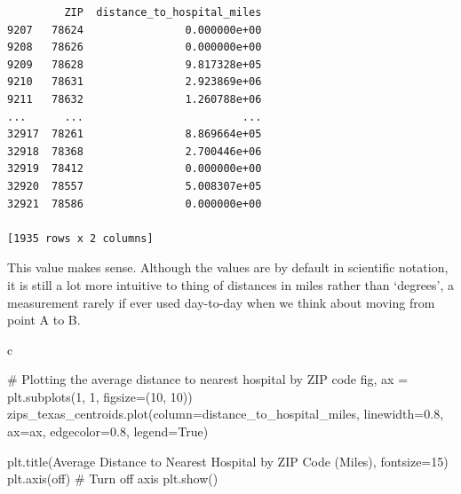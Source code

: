 \documentclass[
  letterpaper,
  DIV=11,
  numbers=noendperiod]{scrartcl}
\newenvironment{Shaded}{\begin{snugshade}}{\end{snugshade}}
\newcommand{\CommentTok}[1]{\textcolor[rgb]{0.37,0.37,0.37}{#1}}
\newcommand{\DecValTok}[1]{\textcolor[rgb]{0.68,0.00,0.00}{#1}}
\newcommand{\FloatTok}[1]{\textcolor[rgb]{0.68,0.00,0.00}{#1}}
\newcommand{\NormalTok}[1]{\textcolor[rgb]{0.00,0.23,0.31}{#1}}
\newcommand{\OperatorTok}[1]{\textcolor[rgb]{0.37,0.37,0.37}{#1}}
\newcommand{\StringTok}[1]{\textcolor[rgb]{0.13,0.47,0.30}{#1}}
\newcommand{\VariableTok}[1]{\textcolor[rgb]{0.07,0.07,0.07}{#1}}
\begin{document}
\begin{verbatim}
         ZIP  distance_to_hospital_miles
9207   78624                0.000000e+00
9208   78626                0.000000e+00
9209   78628                9.817328e+05
9210   78631                2.923869e+06
9211   78632                1.260788e+06
...      ...                         ...
32917  78261                8.869664e+05
32918  78368                2.700446e+06
32919  78412                0.000000e+00
32920  78557                5.008307e+05
32921  78586                0.000000e+00

[1935 rows x 2 columns]
\end{verbatim}

This value makes sense. Although the values are by default in scientific
notation, it is still a lot more intuitive to thing of distances in
miles rather than `degrees', a measurement rarely if ever used
day-to-day when we think about moving from point A to B.

c

\begin{Shaded}
\begin{Highlighting}[]
\CommentTok{\# Plotting the average distance to nearest hospital by ZIP code}
\NormalTok{fig, ax }\OperatorTok{=}\NormalTok{ plt.subplots(}\DecValTok{1}\NormalTok{, }\DecValTok{1}\NormalTok{, figsize}\OperatorTok{=}\NormalTok{(}\DecValTok{10}\NormalTok{, }\DecValTok{10}\NormalTok{))}
\NormalTok{zips\_texas\_centroids.plot(column}\OperatorTok{=}\StringTok{\textquotesingle{}distance\_to\_hospital\_miles\textquotesingle{}}\NormalTok{,}
\NormalTok{                          linewidth}\OperatorTok{=}\FloatTok{0.8}\NormalTok{, ax}\OperatorTok{=}\NormalTok{ax, edgecolor}\OperatorTok{=}\StringTok{\textquotesingle{}0.8\textquotesingle{}}\NormalTok{, legend}\OperatorTok{=}\VariableTok{True}\NormalTok{)}

\NormalTok{plt.title(}\StringTok{\textquotesingle{}Average Distance to Nearest Hospital by ZIP Code (Miles)\textquotesingle{}}\NormalTok{, fontsize}\OperatorTok{=}\DecValTok{15}\NormalTok{)}
\NormalTok{plt.axis(}\StringTok{\textquotesingle{}off\textquotesingle{}}\NormalTok{)  }\CommentTok{\# Turn off axis}
\NormalTok{plt.show()}
\end{Highlighting}
\end{Shaded}
\end{document}
